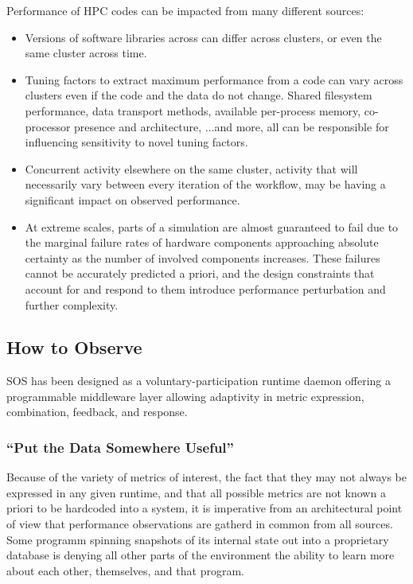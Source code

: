 Performance of HPC codes can be impacted from many different sources:
\begin{itemize}
    \item Versions of software libraries across can differ across
      clusters, or even the same cluster across time.
    \item Tuning factors to extract maximum performance from a code
      can vary across clusters even if the code and the data do not
      change. Shared filesystem performance, data transport methods,
      available per-process memory, co-processor presence and
      architecture, ...and more, all can be responsible for
      influencing sensitivity to novel tuning factors.
    \item Concurrent activity elsewhere on the same cluster, activity
      that will necessarily vary between every iteration of the
      workflow, may be having a significant impact on observed
      performance.
    \item At extreme scales, parts of a simulation are almost
      guaranteed to fail due to the marginal failure rates of hardware
      components approaching absolute certainty as the number of
      involved components increases. These failures cannot be
      accurately predicted a priori, and the design constraints that
      account for and respond to them introduce performance
      perturbation and further complexity.
\end{itemize}



\subsection{How to Observe}
SOS has been designed as a voluntary-participation runtime daemon
offering a programmable middleware layer allowing adaptivity in metric
expression, combination, feedback, and response.

\subsubsection{``Put the Data Somewhere Useful''}
Because of the variety of metrics of interest, the fact that they may
not always be expressed in any given runtime, and that all possible
metrics are not known a priori to be hardcoded into a system, it is
imperative from an architectural point of view that performance
observations are gatherd in common from all sources.  Some programm
spinning snapshots of its internal state out into a proprietary
database is denying all other parts of the environment the ability to
learn more about each other, themselves, and that program.

